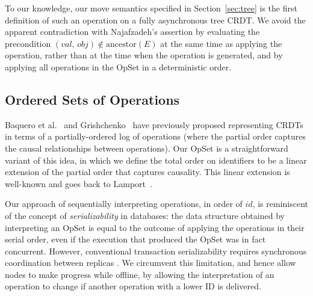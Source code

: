 To our knowledge, our move semantics specified in Section~\ref{sec:tree} is the first definition of such an operation on a fully asynchronous tree CRDT.
We avoid the apparent contradiction with Najafzadeh's assertion by evaluating the precondition $(\mathit{val},\, \mathit{obj}) \notin \mathrm{ancestor}(E)$ at the same time as applying the operation, rather than at the time when the operation is generated, and by applying all operations in the OpSet in a deterministic order.

\subsection{Ordered Sets of Operations}

Baquero et al.~\cite{Baquero:2014ed} and Grishchenko~\cite{Grishchenko:2014eh} have previously proposed representing CRDTs in terms of a partially-ordered log of operations (where the partial order captures the causal relationships between operations).
Our OpSet is a straightforward variant of this idea, in which we define the total order on identifiers to be a linear extension of the partial order that captures causality.
This linear extension is well-known and goes back to Lamport~\cite{Lamport:1978jq}.

Our approach of sequentially interpreting operations, in order of $\mathit{id}$, is reminiscent of the concept of \emph{serializability} in databases: the data structure obtained by interpreting an OpSet is equal to the outcome of applying the operations in their serial order, even if the execution that produced the OpSet was in fact concurrent.
However, conventional transaction serializability requires synchronous coordination between replicas \cite{Davidson:1985hv}.
We circumvent this limitation, and hence allow nodes to make progress while offline, by allowing the interpretation of an operation to change if another operation with a lower ID is delivered.
